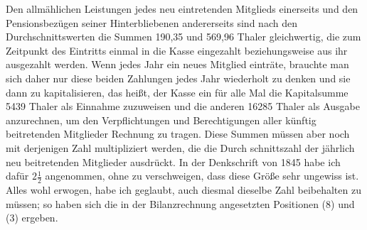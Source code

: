 Den allmählichen Leistungen jedes neu eintretenden Mitglieds einerseits und den Pensionsbezügen seiner Hinterbliebenen andererseits sind nach den Durchschnittswerten die Summen 190,35 und 569,96 Thaler gleichwertig, die zum Zeitpunkt des Eintritts einmal in die Kasse eingezahlt beziehungsweise aus ihr ausgezahlt werden. Wenn jedes Jahr ein neues Mitglied einträte, brauchte man sich daher nur diese beiden Zahlungen jedes Jahr wiederholt zu denken und sie dann zu kapitalisieren, das heißt, der Kasse ein für alle Mal die Kapitalsumme 5439 Thaler als Einnahme zuzuweisen und die anderen 16285 Thaler als Ausgabe anzurechnen, um den Verpflichtungen und Berechtigungen aller künftig beitretenden Mitglieder Rechnung zu tragen. Diese Summen müssen aber noch mit derjenigen Zahl multipliziert werden, die die Durch%
schnittszahl der jährlich neu beitretenden Mitglieder ausdrückt. In der Denkschrift von 1845 habe ich dafür \(2\tfrac{1}{2}\) angenommen, ohne zu verschweigen, dass diese Größe sehr ungewiss ist. Alles wohl erwogen, habe ich geglaubt, auch diesmal dieselbe Zahl beibehalten zu müssen; so haben sich die in der Bilanzrechnung angesetzten Positionen (8) und (3) ergeben.
